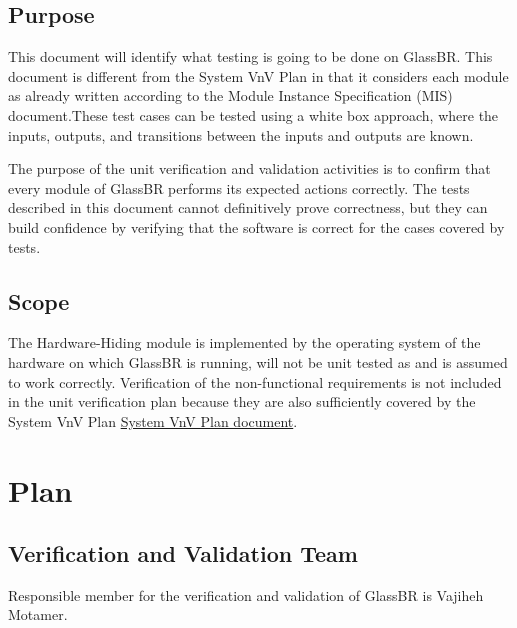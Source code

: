 \documentclass[12pt]{article}
\newcommand{\progname}{GlassBR}
\begin{document}
\subsection{Purpose}

\noindent This document will identify what testing is going to be done on \progname{}. 
This document is different from the System VnV Plan in that it considers each 
module as already written according to the Module Instance Specification (MIS) 
document.These test cases can be tested using a white box approach, where the inputs, outputs, and 
transitions between the inputs and outputs are known.

\noindent The purpose of the unit verification and validation activities is to 
confirm that every module of \progname{} performs its expected actions 
correctly. The tests described in this document cannot definitively prove 
correctness, but they can build confidence by verifying that the software is 
correct for the cases covered by tests.

\subsection{Scope} \label{Scope}

\noindent The Hardware-Hiding module is implemented by the operating system of the hardware on which \progname{} 
is running, will not be unit tested as 
 and is assumed to work correctly. Verification of the non-functional requirements is 
not included in the unit verification plan because they are also sufficiently 
covered by the System VnV Plan \href{https://github.com/smiths/caseStudies/blob/glass_UnitVnV/CaseStudies/glass/docs/VnVPlan/SystVnVPlan/SystVnVPlan.pdf}
{System VnV Plan document}.


\section{Plan} \label{sec_Plan}
	
\subsection{Verification and Validation Team}
Responsible member for the verification and validation of GlassBR is Vajiheh Motamer.
\end{document}
